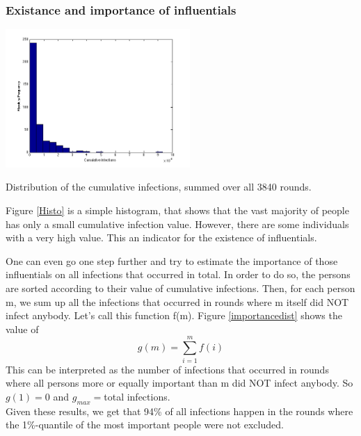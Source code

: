 \subsubsection{Existance and importance of influentials}


\begin{minipage}{0.5\textwidth}
\includegraphics[width=7cm]{influ2}
\caption{Distribution of the cumulative infections, summed over all 3840 rounds. \newline}
\label{Histo}
\end{minipage}
\begin{minipage}{0.5\textwidth}
Figure \ref{Histo} is a simple histogram, that shows that the vast majority of people has only a small cumulative infection value. However, there are some individuals with a very high value. This an indicator for the existence of influentials.   \\
\end{minipage}




\noindent One can even go one step further and try to estimate the importance of those influentials on all infections that occurred in total. In order to do so, the persons are sorted according to their value of cumulative infections. Then, for each person m, we sum up all the infections that occurred in rounds where m itself did NOT infect anybody. Let's call this function f(m). Figure \ref{importancedist} shows the value of $$g(m)=\sum_{i=1}^m f(i) $$
This can be interpreted as the number of infections that occurred in rounds where all persons more or equally important than m did NOT infect anybody. So $g(1)=0$ and $g_{max}=$total infections.
\\
Given these results, we get that 94\% of all infections happen in the rounds where the 1\%-quantile of the most important people were not excluded. 


